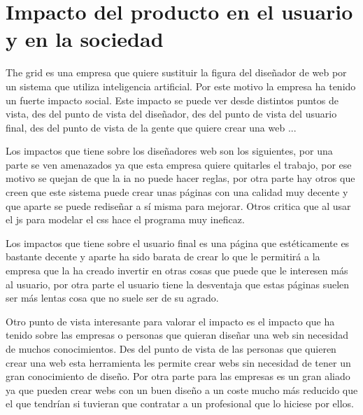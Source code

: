\section{Impacto del producto en el usuario y en la sociedad}

The grid es una empresa que quiere sustituir la figura del diseñador de 
web por un sistema que utiliza inteligencia artificial. Por este motivo
la empresa ha tenido un fuerte impacto social. Este impacto se puede ver
desde distintos puntos de vista, des del punto de vista del diseñador,
des del punto de vista del usuario final, des del punto de vista de la
gente que quiere crear una web ...

Los impactos que tiene sobre los diseñadores web son los siguientes, por
una parte se ven amenazados ya que esta empresa quiere quitarles el 
trabajo, por ese motivo se quejan de que la ia no puede hacer reglas,
por otra parte hay otros que creen que este sistema puede crear unas
páginas con una calidad muy decente y que aparte se puede rediseñar a sí
misma para mejorar. Otros critica que al usar el js para modelar el css
hace el programa muy ineficaz.

Los impactos que tiene sobre el usuario final es una página que 
estéticamente es bastante decente y aparte ha sido barata de crear 
lo que le permitirá a la empresa que la ha creado invertir en otras
cosas que puede que le interesen más al usuario, por otra parte el
usuario tiene la desventaja que estas páginas suelen ser más lentas
cosa que  no suele ser de su agrado.

Otro punto de vista interesante para valorar el impacto es el impacto
que ha tenido sobre las empresas o personas que quieran diseñar una web
sin necesidad de muchos conocimientos. Des del punto de vista de las
personas que quieren crear una web esta herramienta les permite crear
webs sin necesidad de tener un gran conocimiento de diseño.
Por otra parte para las empresas es un gran aliado ya que pueden crear
webs con un buen diseño a un coste mucho más reducido que el que tendrían
si tuvieran que contratar a un profesional que lo hiciese por ellos.

